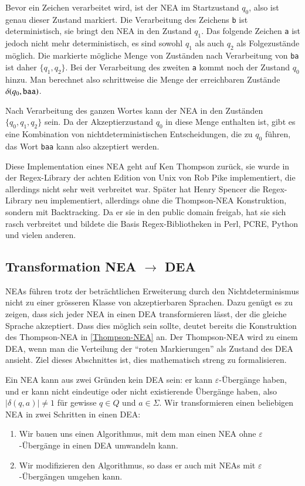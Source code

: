 Bevor ein Zeichen verarbeitet wird,
ist der NEA im Startzustand $q_0$, also ist genau dieser Zustand
markiert.
Die Verarbeitung des Zeichens {\tt b} ist deterministisch,
sie bringt den NEA in den Zustand $q_1$.
Das folgende Zeichen {\tt a}
ist jedoch nicht mehr deterministisch, es sind sowohl $q_1$ als auch
$q_2$ als Folgezustände möglich.
Die markierte mögliche Menge von Zuständen nach Verarbeitung von {\tt ba}
ist daher $\{q_1,q_2\}$.
Bei der Verarbeitung des zweiten {\tt a} kommt noch der Zustand $q_0$ hinzu.
Man berechnet also schrittweise die
Menge der erreichbaren Zustände $\delta(q_0,{\tt baa})$.

Nach Verarbeitung des ganzen Wortes kann der NEA in den Zuständen
$\{q_0,q_1,q_2\}$ sein.
Da der Akzeptierzustand $q_0$ in diese Menge
enthalten ist, gibt es eine Kombination von nichtdeterministischen
Entscheidungen, die zu $q_0$ führen, das Wort {\tt baa} kann also
akzeptiert werden.

Diese Implementation eines NEA geht auf Ken Thompson zurück, sie wurde in
der Regex-Library der achten Edition von Unix von Rob Pike
 implementiert, die allerdings nicht sehr weit
verbreitet war.
Später hat Henry Spencer die Regex-Library neu
implementiert, allerdings ohne die Thompson-NEA Konstruktion, sondern
mit Backtracking.
Da er sie in den public domain freigab, hat sie sich
rasch verbreitet und bildete die Basis Regex-Bibliotheken in Perl, PCRE,
Python und vielen anderen.

\subsection{Transformation NEA \texorpdfstring{$\rightarrow$}{->} DEA\label{regulaer:nea-dea}}
NEAs führen trotz der beträchtlichen Erweiterung durch den
Nichtdeterminismus nicht zu einer grösseren Klasse von akzeptierbaren
Sprachen.
Dazu genügt es zu zeigen, dass sich jeder NEA in einen DEA
transformieren lässt, der die gleiche Sprache akzeptiert.
Dass dies möglich sein sollte, deutet bereits die Konstruktion
des Thompson-NEA in \ref{Thompson-NEA} an.
Der Thompson-NEA wird zu einem DEA, wenn man die Verteilung der
``roten Markierungen'' als Zustand des DEA ansieht.
Ziel dieses Abschnittes ist, dies
mathematisch streng zu formalisieren.

Ein NEA kann aus zwei Gründen kein DEA sein:
er kann $\varepsilon$-Übergänge haben, und er kann nicht eindeutige
oder nicht existierende Übergänge haben, also $|\delta(q,a)|\ne 1$
für gewisse $q\in Q$ und $a\in\Sigma$.
Wir transformieren einen 
beliebigen NEA in zwei Schritten in einen DEA:
\begin{enumerate}
\item Wir bauen uns einen Algorithmus, mit dem man einen NEA ohne
$\varepsilon$-Übergänge in einen DEA umwandeln kann.
\item Wir modifizieren den Algorithmus, so dass er auch mit NEAs mit
$\varepsilon$-Übergängen umgehen kann.
\end{enumerate}

